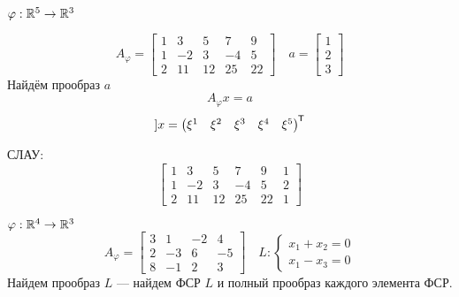 \begin{example}
    $\varphi : \mathbb{R}^5\to\mathbb{R}^3$

    $$A_\varphi = \begin{bmatrix}
            1 & 3  & 5  & 7  & 9  \\
            1 & -2 & 3  & -4 & 5  \\
            2 & 11 & 12 & 25 & 22
        \end{bmatrix} \quad a=\begin{bmatrix} 1 \\ 2 \\ 3\end{bmatrix}$$
    Найдём прообраз $a$
    $$A_\varphi x = a$$
    $$] x = \begin{pmatrix}
            \xi^1 & \xi^2 & \xi^3 & \xi^4 & \xi^5
        \end{pmatrix}^{\mkern-1.5mu\mathsf{T}} $$

    СЛАУ:
    $$\begin{bmatrix}
            1 & 3  & 5  & 7  & 9  & 1 \\
            1 & -2 & 3  & -4 & 5  & 2 \\
            2 & 11 & 12 & 25 & 22 & 1
        \end{bmatrix}$$
\end{example}

\begin{example}
    $\varphi : \mathbb{R}^4 \to \mathbb{R}^3$
    $$A_\varphi = \begin{bmatrix}
            3 & 1  & -2 & 4  \\
            2 & -3 & 6  & -5 \\
            8 & -1 & 2  & 3
        \end{bmatrix} \quad L:\begin{cases}
            x_1 + x_2 = 0 \\
            x_1 - x_3 = 0
        \end{cases}$$
    Найдем прообраз $L$ --- найдем ФСР $L$ и полный прообраз каждого элемента ФСР.
\end{example}

